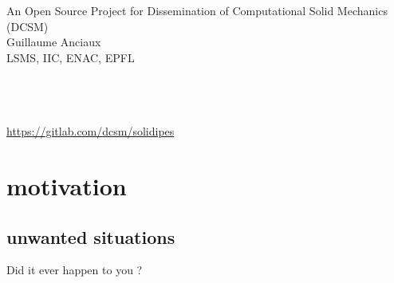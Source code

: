 \documentclass[10pt,compress,serif,aspectratio=169]{beamer}
\begin{document}
\begin{frame}[t]
  \begin{center}
  \vspace{1cm}
  {An Open Source Project for Dissemination of Computational
Solid Mechanics (DCSM)}\\
  \vspace{.5cm}
  {\Large Guillaume Anciaux}\\{LSMS, IIC, ENAC, EPFL}\\
  \end{center}
\vspace{.5cm}
\qquad {} \\ \vspace{.2cm}
 \qquad {}\\\\{\small\url{https://gitlab.com/dcsm/solidipes}}\\
\end{frame}





\section{motivation}
\subsection{unwanted situations}
\begin{frame}{Did it ever happen to you ?}
\end{frame}


\end{document}
